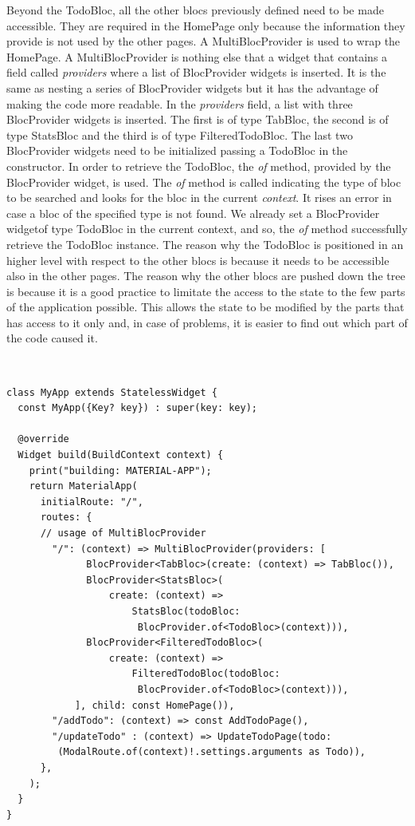 Beyond the TodoBloc, all the other blocs previously defined need to be made accessible. They are required in the HomePage only because the information they provide is not used by the other pages. A MultiBlocProvider is used to wrap the HomePage.  A MultiBlocProvider is nothing else that a widget that contains a field called \textit{providers} where a list of BlocProvider widgets is inserted.  It is the same as nesting a series of BlocProvider widgets but it has the advantage of making the code more readable. In the \textit{providers} field, a list with three BlocProvider widgets is inserted. The first is of type TabBloc, the second is of type StatsBloc and the third is of type FilteredTodoBloc. The last two BlocProvider widgets need to be initialized passing a TodoBloc in the constructor. In order to retrieve the TodoBloc, the \textit{of }method, provided by the BlocProvider widget, is used. The \textit{of} method is called indicating the type of bloc to be searched and looks for the bloc in the current \textit{context}. It rises an error in case a bloc of the specified type is not found. We already set a BlocProvider widgetof type TodoBloc in the current context, and so,  the \textit{of} method successfully retrieve the TodoBloc instance. The reason why the TodoBloc is positioned in an higher level with respect to the other blocs is because it needs to be accessible also in the other pages. The reason why the other blocs are pushed down the tree is because it is a good practice to limitate the access to the state to the few parts of the application possible. This allows the state to be modified by the parts that has access to it only and,  in case of problems, it is easier to find out which part of the code caused it.
\begin{code}
\mbox{}\\
 \mbox{}
\label{code:2.14}
\begin{verbatim}
class MyApp extends StatelessWidget {
  const MyApp({Key? key}) : super(key: key);

  @override
  Widget build(BuildContext context) {
    print("building: MATERIAL-APP");
    return MaterialApp(
      initialRoute: "/",
      routes: {
      // usage of MultiBlocProvider
        "/": (context) => MultiBlocProvider(providers: [
              BlocProvider<TabBloc>(create: (context) => TabBloc()),
              BlocProvider<StatsBloc>(
                  create: (context) =>
                      StatsBloc(todoBloc:
                       BlocProvider.of<TodoBloc>(context))),
              BlocProvider<FilteredTodoBloc>(
                  create: (context) =>
                      FilteredTodoBloc(todoBloc:
                       BlocProvider.of<TodoBloc>(context))),
            ], child: const HomePage()),
        "/addTodo": (context) => const AddTodoPage(),
        "/updateTodo" : (context) => UpdateTodoPage(todo:
         (ModalRoute.of(context)!.settings.arguments as Todo)),
      },
    );
  }
}
\end{verbatim}
\mbox{}
\end{code}

